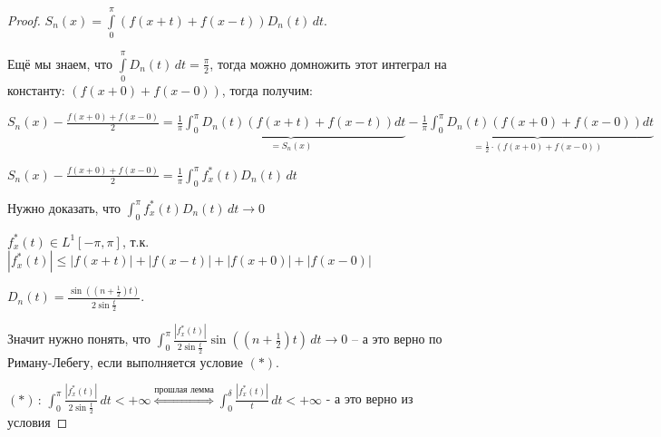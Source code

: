 \begin{proof}
    $S_n (x) = \int\limits_0^\pi (f(x + t) + f(x - t)) D_n (t) \, dt$.

    Ещё мы знаем, что $\int\limits_0^\pi D_n (t) \, dt = \frac{\pi}{2}$, тогда можно домножить этот интеграл на константу: $(f(x + 0) + f(x - 0))$, тогда получим:

    $S_n(x) - \frac{f(x + 0) + f(x - 0)}{2} = \underbrace{\frac{1}{\pi} \int_{0}^{\pi} D_n(t) (f(x + t) + f(x - t)) dt}_{=S_n(x)} - \underbrace{\frac{1}{\pi} \int_{0}^{\pi} D_n(t) (f(x + 0) + f(x - 0)) dt}_{=\frac{1}{2} \cdot (f(x + 0) + f(x - 0))}$

    $S_n(x) - \frac{f(x + 0) + f(x - 0)}{2} = \frac{1}{\pi} \int_0^\pi f_x^* (t) D_n (t) \, dt $

    Нужно доказать, что $\int_0^\pi f_x^* (t) D_n (t) \, dt \rightarrow 0$

    $f_x^* (t) \in L^1 [-\pi, \pi]$, т.к. $|f_x^* (t)| \leqslant |f(x + t)| + |f(x - t)| + |f(x + 0)| + |f(x - 0)|$

    $D_n(t) = \frac{\sin ((n + \frac{1}{2})t)}{2\sin \frac{t}{2}}$.

    Значит нужно понять, что $\int_0^\pi \frac{|f_x^* (t)|}{2 \sin \frac{t}{2}} \sin ((n + \frac{1}{2})t) \, dt \rightarrow 0$ -- а это верно по Риману-Лебегу, если выполняется условие $(*)$.

    $(*) \, : \, \int_0^\pi \frac{|f_x^* (t)|}{2 \sin \frac{t}{2}} \, dt < +\infty \overset{\text{прошлая лемма}}{\Longleftrightarrow} \int_0^\delta \frac{|f_x^* (t)|}{t} \, dt < +\infty$ - а это верно из условия
\end{proof}

